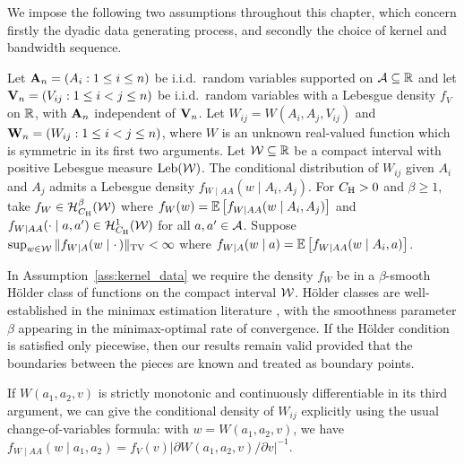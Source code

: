 We impose the following two assumptions throughout this chapter,
which concern firstly the dyadic data generating process, and
secondly the choice of kernel and bandwidth sequence.

%
\begin{assumption}\label{ass:kernel_data}
  Let $\mathbf{A}_n = (A_i: 1 \leq i \leq n)$ be i.i.d.\ random variables supported on
  $\mathcal{A} \subseteq \mathbb{R}$ and let $\mathbf{V}_n = (V_{i j}: 1 \leq i < j \leq n)$ be
  i.i.d.\ random variables with a Lebesgue density $f_V$ on $\mathbb{R}$, with $\mathbf{A}_n$
  independent of $\mathbf{V}_n$.
  Let $W_{i j} = W(A_i, A_j, V_{i j})$ and
  $\mathbf{W}_n = (W_{i j}: 1 \leq i < j \leq n)$, where $W$ is an unknown real-valued
  function which is symmetric in its first two arguments.
  Let $\mathcal{W} \subseteq \mathbb{R}$ be a compact interval with positive Lebesgue measure
  $\operatorname{Leb}(\mathcal{W})$. The conditional distribution of $W_{i j}$ given $A_i$ and $A_j$
  admits a Lebesgue density $f_{W \mid AA}(w \mid A_i, A_j)$.
  For $C_{\mathrm{H}} > 0$ and $\beta \geq 1$, take $f_W \in \mathcal{H}^\beta_{C_{\mathrm{H}}}(\mathcal{W})$
  where $f_{W}(w) = \mathbb{E}\left[f_{W \mid AA}(w \mid A_i,A_j)\right]$ and
  $f_{W \mid AA}(\cdot \mid a, a') \in \mathcal{H}^1_{C_{\mathrm{H}}}(\mathcal{W})$
  for all $a,a' \in \mathcal{A}$. Suppose
  $\sup_{w \in \mathcal{W}} \|f_{W \mid A}(w \mid \cdot\,)\|_{\mathrm{TV}} <\infty$ where
  $f_{W \mid A}(w \mid a) = \mathbb{E}\left[f_{W \mid AA}(w \mid A_i,a)\right]$.
\end{assumption}

In Assumption~\ref{ass:kernel_data} we require the density $f_W$ be in a
$\beta$-smooth H\"older class of functions on the compact interval $\mathcal{W}$.
H\"older classes are well-established in the minimax estimation literature
\citep{stone1982optimal,gine2021mathematical},
with the smoothness parameter $\beta$ appearing
in the minimax-optimal rate of convergence. If the H\"older condition is
satisfied only piecewise, then our results remain valid provided that the
boundaries between the pieces are known and treated as boundary points.

If $W(a_1, a_2, v)$ is strictly monotonic and continuously differentiable in
its third argument, we can give the conditional density of $W_{i j}$ explicitly
using the usual change-of-variables formula: with $w=W(a_1,a_2,v)$, we have
$f_{W \mid AA}(w \mid a_1,a_2)
= f_V(v) \big|\partial W(a_1,a_2,v)/\partial v\big|^{-1}$.

